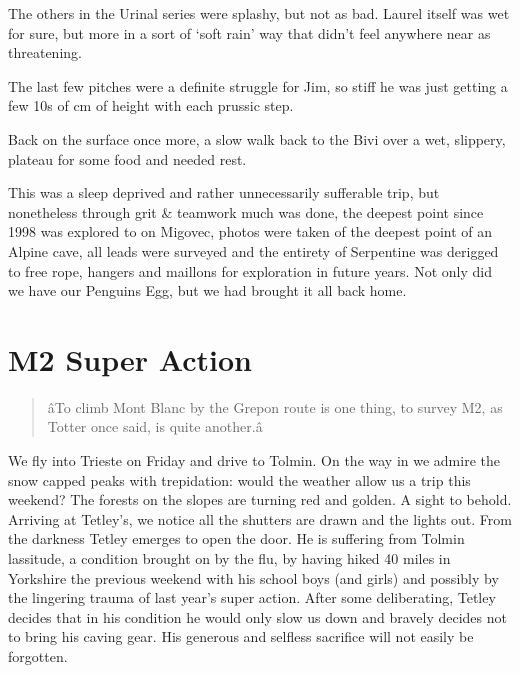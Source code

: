 The others in the Urinal series were splashy, but not as bad. Laurel
itself was wet for sure, but more in a sort of `soft rain' way that
didn't feel anywhere near as threatening.

The last few pitches were a definite struggle for Jim, so stiff he was
just getting a few 10s of cm of height with each prussic step.

Back on the surface once more, a slow walk back to the Bivi over a wet,
slippery, plateau for some food and needed rest.

This was a sleep deprived and rather unnecessarily sufferable trip, but
nonetheless through grit \& teamwork much was done, the deepest point
since 1998 was explored to on Migovec, photos were taken of the deepest
point of an Alpine cave, all leads were surveyed and the entirety of
Serpentine was derigged to free rope, hangers and maillons for
exploration in future years. Not only did we have our Penguins Egg, but
we had brought it all back home.


\section{M2 Super Action}

\begin{verse}
âTo climb Mont Blanc by the Grepon route is one thing, to survey M2, as Totter once said, is quite another.â
\end{verse}

We fly into Trieste on Friday and drive to Tolmin. On the way in we
admire the snow capped peaks with trepidation: would the weather allow
us a trip this weekend? The forests on the slopes are turning red and
golden. A sight to behold. Arriving at Tetley's, we notice all the
shutters are drawn and the lights out. From the darkness Tetley emerges
to open the door. He is suffering from Tolmin lassitude, a condition
brought on by the flu, by having hiked 40 miles in Yorkshire the
previous weekend with his school boys (and girls) and possibly by the
lingering trauma of last year's super action. After some deliberating,
Tetley decides that in his condition he would only slow us down and
bravely decides not to bring his caving gear. His generous and selfless
sacrifice will not easily be forgotten.


